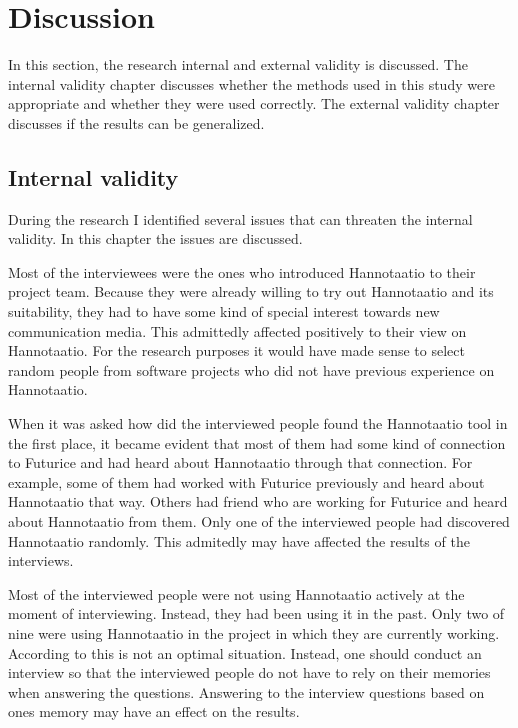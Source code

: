 \documentclass[english,12pt,a4paper,pdftex]{article}
\begin{document}
\clearpage

\section{Discussion}
\label{sec:discussion}
\acresetall

In this section, the research internal and external validity is discussed. The internal validity chapter discusses whether the methods used in this study were appropriate and whether they were used correctly. The external validity chapter discusses if the results can be generalized.

\subsection{Internal validity}

During the research I identified several issues that can threaten the internal validity. In this chapter the issues are discussed.

Most of the interviewees were the ones who introduced Hannotaatio to their project team. Because they were already willing to try out Hannotaatio and its suitability, they had to have some kind of special interest towards new communication media. This admittedly affected positively to their view on Hannotaatio. For the research purposes it would have made sense to select random people from software projects who did not have previous experience on Hannotaatio.

When it was asked how did the interviewed people found the Hannotaatio tool in the first place, it became evident that most of them had some kind of connection to Futurice and had heard about Hannotaatio through that connection. For example, some of them had worked with Futurice previously and heard about Hannotaatio that way. Others had friend who are working for Futurice and heard about Hannotaatio from them. Only one of the interviewed people had discovered Hannotaatio randomly. This admitedly may have affected the results of the interviews. 

Most of the interviewed people were not using Hannotaatio actively at the moment of interviewing. Instead, they had been using it in the past. Only two of nine were using Hannotaatio in the project in which they are currently working. According to \citet{silverman2009} this is not an optimal situation. Instead, one should conduct an interview so that the interviewed people do not have to rely on their memories when answering the questions. Answering to the interview questions based on ones memory may have an effect on the results.
\end{document}
